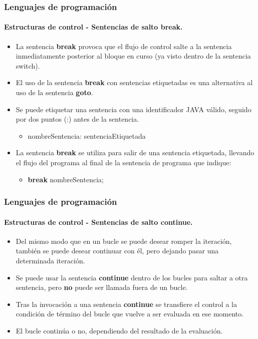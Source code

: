 \documentclass{beamer}
\begin{document}
		\begin{frame}
			\frametitle{Lenguajes de programaci\'on}
			\framesubtitle{Estructuras de control - Sentencias de salto \textbf{break}.}

			\begin{itemize}
				\item La sentencia \textbf{break} provoca que el flujo de control salte a la sentencia inmediatamente posterior al bloque en curso (ya visto dentro de la sentencia switch).
				\item El uso de la sentencia \textbf{break} con sentencias etiquetadas es una alternativa al uso de la sentencia \textbf{goto}.
				\item Se puede etiquetar una sentencia con una identificador JAVA v\'alido, seguido por dos puntos (:) antes de la sentencia.
				\begin{itemize}
					\item nombreSentencia: sentenciaEtiquetada
				\end{itemize}
				\item La sentencia \textbf{break} se utiliza para salir de una sentencia etiquetada, llevando el flujo del programa al final de la sentencia de programa que indique:
				\begin{itemize}
					\item \textbf{break} nombreSentencia;
				\end{itemize}
			\end{itemize}
		\end{frame}

		\begin{frame}
			\frametitle{Lenguajes de programaci\'on}
			\framesubtitle{Estructuras de control - Sentencias de salto \textbf{continue}.}

			\begin{itemize}
				\item Del mismo modo que en un bucle se puede desear romper la iteraci\'on, tambi\'en se puede desear continuar con \'el, pero dejando pasar una determinada iteraci\'on.
				\item Se puede usar la sentencia \textbf{continue} dentro de los bucles para saltar a otra sentencia, pero \textbf{no} puede ser llamada fuera de un bucle.
				\item Tras la invocaci\'on a una sentencia \textbf{continue} se transfiere el control a la condici\'on de t\'ermino del bucle que vuelve a ser evaluada en ese momento.
				\item El bucle contin\'ua o no, dependiendo del resultado de la evaluaci\'on.
			\end{itemize}
		\end{frame}
\end{document}
